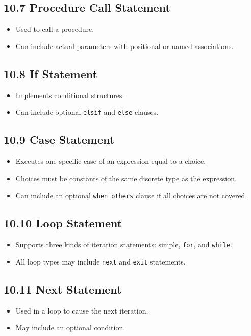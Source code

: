 \documentclass[a4paper,12pt]{article}
\begin{document}
	\subsection*{10.7 Procedure Call Statement}
	\begin{itemize}
		\item Used to call a procedure.
		\item Can include actual parameters with positional or named associations.
	\end{itemize}
	
	\subsection*{10.8 If Statement}
	\begin{itemize}
		\item Implements conditional structures.
		\item Can include optional \texttt{elsif} and \texttt{else} clauses.
	\end{itemize}
	
	\subsection*{10.9 Case Statement}
	\begin{itemize}
		\item Executes one specific case of an expression equal to a choice.
		\item Choices must be constants of the same discrete type as the expression.
		\item Can include an optional \texttt{when others} clause if all choices are not covered.
	\end{itemize}
	
	\subsection*{10.10 Loop Statement}
	\begin{itemize}
		\item Supports three kinds of iteration statements: simple, \texttt{for}, and \texttt{while}.
		\item All loop types may include \texttt{next} and \texttt{exit} statements.
	\end{itemize}
	
	\subsection*{10.11 Next Statement}
	\begin{itemize}
		\item Used in a loop to cause the next iteration.
		\item May include an optional condition.
	\end{itemize}
	
\end{document}
